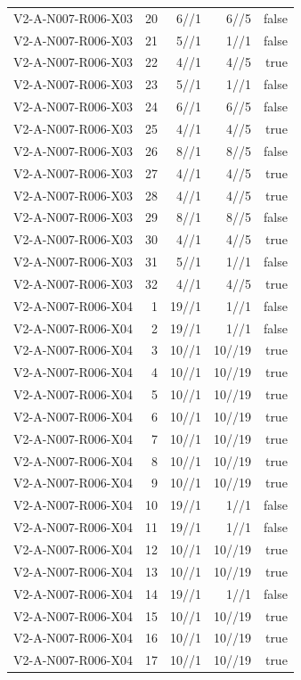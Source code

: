 {\begin{longtable}{lrrrr}
V2-A-N007-R006-X03 & 20 & 6//1 & 6//5 & false \\
V2-A-N007-R006-X03 & 21 & 5//1 & 1//1 & false \\
V2-A-N007-R006-X03 & 22 & 4//1 & 4//5 & true \\
V2-A-N007-R006-X03 & 23 & 5//1 & 1//1 & false \\
V2-A-N007-R006-X03 & 24 & 6//1 & 6//5 & false \\
V2-A-N007-R006-X03 & 25 & 4//1 & 4//5 & true \\
V2-A-N007-R006-X03 & 26 & 8//1 & 8//5 & false \\
V2-A-N007-R006-X03 & 27 & 4//1 & 4//5 & true \\
V2-A-N007-R006-X03 & 28 & 4//1 & 4//5 & true \\
V2-A-N007-R006-X03 & 29 & 8//1 & 8//5 & false \\
V2-A-N007-R006-X03 & 30 & 4//1 & 4//5 & true \\
V2-A-N007-R006-X03 & 31 & 5//1 & 1//1 & false \\
V2-A-N007-R006-X03 & 32 & 4//1 & 4//5 & true \\
V2-A-N007-R006-X04 & 1 & 19//1 & 1//1 & false \\
V2-A-N007-R006-X04 & 2 & 19//1 & 1//1 & false \\
V2-A-N007-R006-X04 & 3 & 10//1 & 10//19 & true \\
V2-A-N007-R006-X04 & 4 & 10//1 & 10//19 & true \\
V2-A-N007-R006-X04 & 5 & 10//1 & 10//19 & true \\
V2-A-N007-R006-X04 & 6 & 10//1 & 10//19 & true \\
V2-A-N007-R006-X04 & 7 & 10//1 & 10//19 & true \\
V2-A-N007-R006-X04 & 8 & 10//1 & 10//19 & true \\
V2-A-N007-R006-X04 & 9 & 10//1 & 10//19 & true \\
V2-A-N007-R006-X04 & 10 & 19//1 & 1//1 & false \\
V2-A-N007-R006-X04 & 11 & 19//1 & 1//1 & false \\
V2-A-N007-R006-X04 & 12 & 10//1 & 10//19 & true \\
V2-A-N007-R006-X04 & 13 & 10//1 & 10//19 & true \\
V2-A-N007-R006-X04 & 14 & 19//1 & 1//1 & false \\
V2-A-N007-R006-X04 & 15 & 10//1 & 10//19 & true \\
V2-A-N007-R006-X04 & 16 & 10//1 & 10//19 & true \\
V2-A-N007-R006-X04 & 17 & 10//1 & 10//19 & true \\

\end{longtable}}
